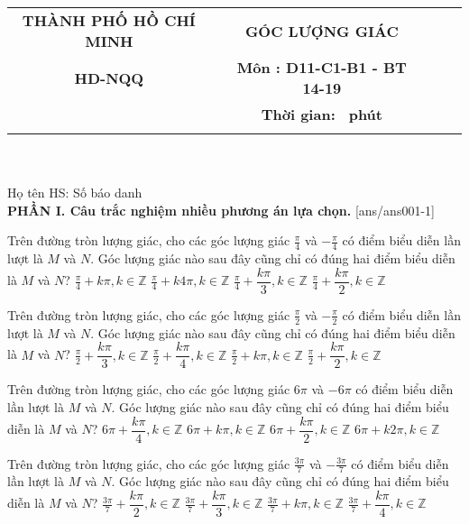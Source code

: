 \documentclass[12pt,a4paper]{article}
\newcommand{\tenso}{THÀNH PHỐ HỒ CHÍ MINH}
\newcommand{\tentruong}{HD-NQQ}
\newcommand{\tenkythi}{GÓC LƯỢNG GIÁC }
\newcommand{\tenmonthi}{Môn : D11-C1-B1 - BT 14-19}
\newcommand{\thoigian}{}
\newcommand{\tieude}[1]{
   \begin{tabular}{cm{1cm}cm{3cm}cm{3cm}}
    {\bf \tenso} & & {\bf \tenkythi} \\
    {\bf \tentruong} & & {\bf \tenmonthi}\\
    && {\bf Thời gian: \bf \thoigian \, phút}\\
    && { \fbox{\bf Mã đề: #1}}
   \end{tabular}\\\\
    
   {Họ tên HS: \dotfill Số báo danh \dotfill}\\
}
\newcommand{\chantrang}[2]{\rfoot{Trang \thepage $-$ Mã đề #2}}
\begin{document}


\tieude{001}
\setcounter{page}{1}
{\bf PHẦN I. Câu trắc nghiệm nhiều phương án lựa chọn.}
\setcounter{ex}{0}
[ans/ans001-1]
\begin{ex}
 Trên đường tròn lượng giác, cho các góc lượng giác ${\frac{\pi}{4}}$ và ${- \frac{\pi}{4}}$ có điểm biểu diễn lần lượt là ${M}$ và ${N}$. Góc lượng giác nào sau đây cũng chỉ có đúng hai điểm biểu diễn là ${M}$ và ${N}$? 
\choice
{ \True $\frac{\pi}{4}+k\pi, k\in \mathbb{Z}$ }
   { $\frac{\pi}{4}+k4\pi, k\in \mathbb{Z}$ }
     { $\frac{\pi}{4}+\dfrac{k\pi }{3}, k\in \mathbb{Z}$ }
    { $\frac{\pi}{4}+\dfrac{k\pi }{2}, k\in \mathbb{Z}$ }
\end{ex}

\begin{ex}
 Trên đường tròn lượng giác, cho các góc lượng giác ${\frac{\pi}{2}}$ và ${- \frac{\pi}{2}}$ có điểm biểu diễn lần lượt là ${M}$ và ${N}$. Góc lượng giác nào sau đây cũng chỉ có đúng hai điểm biểu diễn là ${M}$ và ${N}$? 
\choice
{ $\frac{\pi}{2}+\dfrac{k\pi }{3}, k\in \mathbb{Z}$ }
   { $\frac{\pi}{2}+\dfrac{k\pi }{4}, k\in \mathbb{Z}$ }
     { \True $\frac{\pi}{2}+k\pi, k\in \mathbb{Z}$ }
    { $\frac{\pi}{2}+\dfrac{k\pi }{2}, k\in \mathbb{Z}$ }
\end{ex}

\begin{ex}
 Trên đường tròn lượng giác, cho các góc lượng giác ${6 \pi}$ và ${- 6 \pi}$ có điểm biểu diễn lần lượt là ${M}$ và ${N}$. Góc lượng giác nào sau đây cũng chỉ có đúng hai điểm biểu diễn là ${M}$ và ${N}$? 
\choice
{ $6 \pi+\dfrac{k\pi }{4}, k\in \mathbb{Z}$ }
   { \True $6 \pi+k\pi, k\in \mathbb{Z}$ }
     { $6 \pi+\dfrac{k\pi }{2}, k\in \mathbb{Z}$ }
    { $6 \pi+k2\pi, k\in \mathbb{Z}$ }
\end{ex}

\begin{ex}
 Trên đường tròn lượng giác, cho các góc lượng giác ${\frac{3 \pi}{7}}$ và ${- \frac{3 \pi}{7}}$ có điểm biểu diễn lần lượt là ${M}$ và ${N}$. Góc lượng giác nào sau đây cũng chỉ có đúng hai điểm biểu diễn là ${M}$ và ${N}$? 
\choice
{ $\frac{3 \pi}{7}+\dfrac{k\pi }{2}, k\in \mathbb{Z}$ }
   { $\frac{3 \pi}{7}+\dfrac{k\pi }{3}, k\in \mathbb{Z}$ }
     { \True $\frac{3 \pi}{7}+k\pi, k\in \mathbb{Z}$ }
    { $\frac{3 \pi}{7}+\dfrac{k\pi }{4}, k\in \mathbb{Z}$ }
\end{ex}
\end{document}
